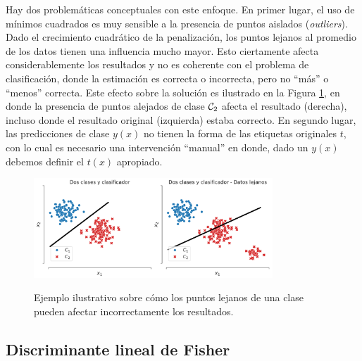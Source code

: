 \begin{remark} Hay dos problemáticas conceptuales con este enfoque. En primer lugar, el uso de mínimos cuadrados es muy sensible a la presencia de puntos aislados (\emph{outliers}). Dado el crecimiento cuadrático de la penalización, los puntos lejanos al promedio de los datos tienen una influencia mucho mayor. Esto ciertamente afecta considerablemente los resultados y no es coherente con el problema de clasificación, donde la estimación es correcta o incorrecta, pero no ``más'' o ``menos'' correcta. Este efecto sobre la solución es ilustrado en la Figura \ref{fig:clasif_mse}, en donde la presencia de puntos alejados de clase ${\mathcal C}_2$ afecta el resultado (derecha), incluso donde el resultado original (izquierda) estaba correcto. En segundo lugar, las predicciones de  clase  $y(x)$ no tienen la forma de las etiquetas originales $t$, con lo cual es necesario una intervención ``manual'' en donde, dado un $y(x)$ debemos definir el $t(x)$ apropiado. 
\end{remark}


\begin{figure}[H]
	\centering
	\includegraphics[width=0.8\textwidth]{img/cap2_dosclases_clasificador.pdf}\\
	\caption{Ejemplo ilustrativo sobre cómo los puntos lejanos de una clase pueden afectar incorrectamente los resultados.}
	\label{fig:clasif_mse}
\end{figure}

\subsection{Discriminante lineal de Fisher}

